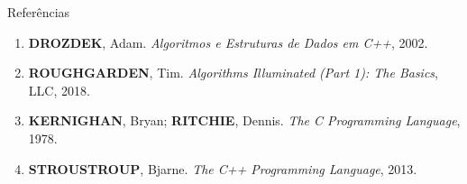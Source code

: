 \begin{frame}[fragile]{Referências}

    \begin{enumerate}
        \item \textbf{DROZDEK}, Adam. \textit{Algoritmos e Estruturas de Dados em C++}, 2002.

        \item \textbf{ROUGHGARDEN}, Tim. \textit{Algorithms Illuminated (Part 1): The Basics}, LLC, 2018.

        \item \textbf{KERNIGHAN}, Bryan; \textbf{RITCHIE}, Dennis. \textit{The C Programming Language}, 1978.

        \item \textbf{STROUSTROUP}, Bjarne. \textit{The C++ Programming Language}, 2013.

    \end{enumerate}

\end{frame}
